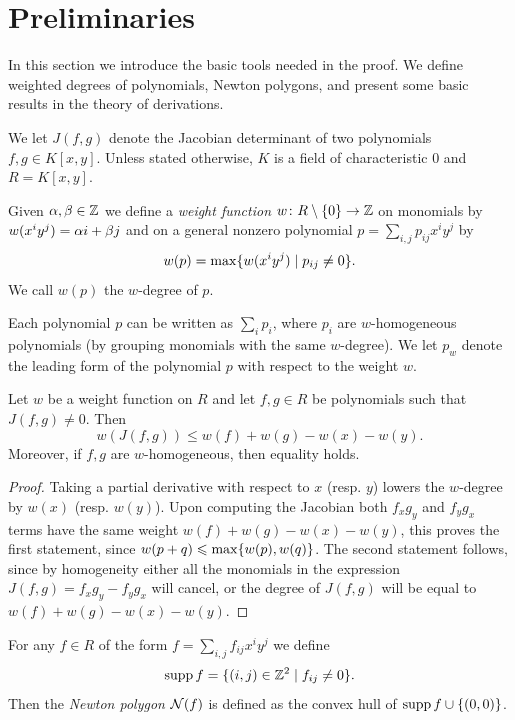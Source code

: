 \documentclass[a4paper,10pt]{amsart}
\begin{document}
\section{Preliminaries}\label{sec:2}
In this section we introduce the basic tools needed in the proof. We define weighted degrees of polynomials, Newton polygons, and present some basic results in the theory of derivations.
\begin{notation}
  We let \(J(f,g)\) denote the Jacobian determinant of two polynomials \(f,g\in K[x,y]\).
  Unless stated otherwise, \(K\) is a field of characteristic 0 and \(R=K[x,y]\).
\end{notation}
\begin{definition}
  Given \(\alpha,\beta\in {\ensuremath{\mathbb{Z}}}\) we define a \emph{weight function} \(w\colon R\setminus\{0\}\to {\ensuremath{\mathbb{Z}}}\) on monomials by \(w(x^iy^j)=\alpha i+\beta j\) and on a general nonzero polynomial \(p=\sum_{i,j}p_{ij}x^iy^j\) by
  \[w(p)=\max\{w(x^iy^j)\mid p_{ij}\ne 0\}.\]
  We call \(w(p)\) the \(w\)-degree of \(p\).
\end{definition}
Each polynomial \(p\) can be written as \(\sum_i p_i\), where \(p_i\) are \(w\)-homogeneous polynomials (by grouping monomials with the same \(w\)-degree).
We let \(p_w\) denote the leading form of the polynomial \(p\) with respect to the weight \(w\).
\begin{proposition}\label{prop:jacob-w}
  Let \(w\) be a weight function on \(R\) and let \(f,g\in R\) be polynomials such that \(J(f,g)\ne 0\). Then
  \[w(J(f,g))\le w(f)+w(g)-w(x)-w(y).\]
  Moreover, if \(f,g\) are \(w\)-homogeneous, then equality holds.
\end{proposition}
\begin{proof}
  Taking a partial derivative with respect to \(x\) (resp. \(y\)) lowers the \(w\)-degree by \(w(x)\) (resp. \(w(y)\)). Upon computing the Jacobian both \(f_xg_y\) and \(f_yg_x\) terms 
  have the same weight \(w(f)+w(g)-w(x)-w(y)\), this proves the first statement, since \(w(p+q)\leqslant \max\{w(p),w(q)\}\). The second statement follows, since by homogeneity either
  all the monomials in the expression \(J(f,g)=f_xg_y-f_yg_x\) will cancel, or the degree of \(J(f,g)\) will be equal to \(w(f)+w(g)-w(x)-w(y)\).
\end{proof}
\begin{definition}
  For any \(f\in R\) of the form \(f=\sum_{i,j}f_{ij}x^iy^j\) we define
  \[\operatorname{supp} f=\{(i,j)\in {\ensuremath{\mathbb{Z}}}^2\mid f_{ij}\ne 0\}.\]
  Then the \emph{Newton polygon} \(\mathcal{N}(f)\) is defined as the convex hull of \(\operatorname{supp} f\cup \{(0,0)\}\).
\end{definition}
\end{document}
